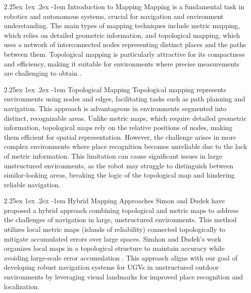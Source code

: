 \documentclass[runningheads]{llncs}
\makeatletter
\renewcommand\paragraph{\@startsection{paragraph}{4}{\z@}%
                                    {2.25ex \@plus1ex \@minus.2ex}%
                                    {-1em}%
                                    {\normalfont\normalsize\bfseries}}
\makeatother
\begin{document}
\paragraph{Introduction to Mapping}
Mapping is a fundamental task in robotics and autonomous systems, crucial for navigation and environment understanding. The main types of mapping techniques include metric mapping, which relies on detailed geometric information, and topological mapping, which uses a network of interconnected nodes representing distinct places and the paths between them. Topological mapping is particularly attractive for its compactness and efficiency, making it suitable for environments where precise measurements are challenging to obtain \cite{HybridTopoMetricMaps}.

\paragraph{Topological Mapping}
Topological mapping represents environments using nodes and edges, facilitating tasks such as path planning and navigation. This approach is advantageous in environments segmented into distinct, recognizable areas. Unlike metric maps, which require detailed geometric information, topological maps rely on the relative positions of nodes, making them efficient for spatial representation. However, the challenge arises in more complex environments where place recognition becomes unreliable due to the lack of metric information. This limitation can cause significant issues in large unstructured environments, as the robot may struggle to distinguish between similar-looking areas, breaking the logic of the topological map and hindering reliable navigation.

\paragraph{Hybrid Mapping Approaches}
Simon and Dudek have proposed a hybrid approach combining topological and metric maps to address the challenges of navigation in large, unstructured environments. This method utilizes local metric maps (islands of reliability) connected topologically to mitigate accumulated errors over large spaces. Simhon and Dudek's work organizes local maps in a topological structure to maintain accuracy while avoiding large-scale error accumulation \cite{HybridTopoMetricMaps}. This approach aligns with our goal of developing robust navigation systems for UGVs in unstructured outdoor environments by leveraging visual landmarks for improved place recognition and localization.
\end{document}
